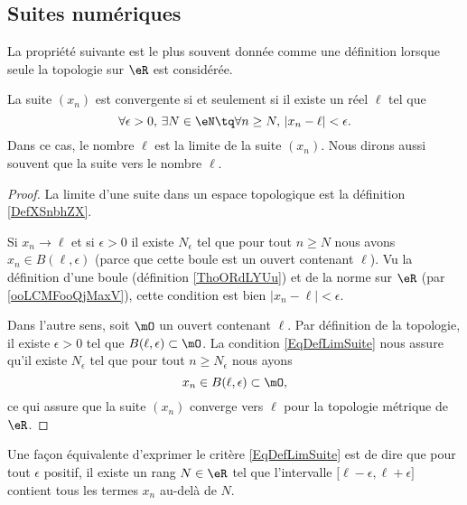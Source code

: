 \subsection{Suites numériques}

La propriété suivante est le plus souvent donnée comme une définition lorsque seule la topologie sur \( \eR\) est considérée.
\begin{proposition}	\label{PropLimiteSuiteNum}
	La suite $(x_n)$ est convergente si et seulement si il existe un réel $\ell$ tel que
	\begin{equation}		\label{EqDefLimSuite}
		\forall \epsilon>0,\,\exists N\in\eN\tq\forall n\geq N,\,| x_n-\ell |<\epsilon.
	\end{equation}
	Dans ce cas, le nombre $\ell$ est la limite de la suite $(x_n)$. Nous dirons aussi souvent que la suite  vers le nombre $\ell$.
\end{proposition}

\begin{proof}
    La limite d'une suite dans un espace topologique est la définition \ref{DefXSnbhZX}. 

    Si \( x_n\to \ell\) et si \( \epsilon>0\) il existe \( N_{\epsilon}\) tel que pour tout \( n\geq N\) nous avons \( x_n\in B(\ell,\epsilon)\) (parce que cette boule est un ouvert contenant \( \ell\)). Vu la définition d'une boule (définition \ref{ThoORdLYUu}) et de la norme sur \( \eR\) (par \ref{ooLCMFooQjMaxV}), cette condition est bien \( | x_n-\ell |<\epsilon\).

    Dans l'autre sens, soit \( \mO\) un ouvert contenant \( \ell\). Par définition de la topologie, il existe \( \epsilon>0\) tel que \( B(\ell,\epsilon)\subset \mO\). La condition \eqref{EqDefLimSuite} nous assure qu'il existe \( N_{\epsilon} \) tel que pour tout \( n\geq N_{\epsilon}\) nous ayons
    \begin{equation}
        x_n\in B(\ell,\epsilon)\subset\mO,
    \end{equation}
    ce qui assure que la suite \( (x_n)\) converge vers \( \ell\) pour la topologie métrique de \( \eR\).
\end{proof}

Une façon équivalente d'exprimer le critère \eqref{EqDefLimSuite} est de dire que pour tout $\epsilon$ positif, il existe un rang $N\in\eR$ tel que l'intervalle $\mathopen[ \ell-\epsilon , \ell+\epsilon \mathclose]$ contient tous les termes $x_n$ au-delà de $N$.

